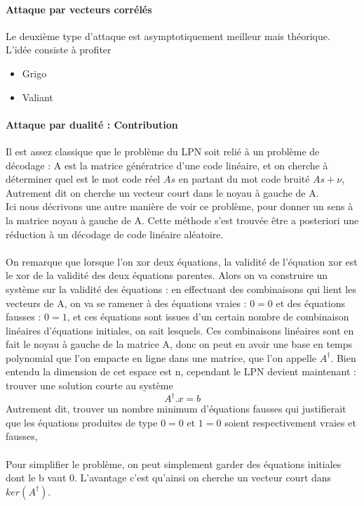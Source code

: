 \documentclass{article}		%
\theoremstyle{definition}
\theoremstyle{plain}
\begin{document}
\paragraph{Attaque par vecteurs corrélés}
Le deuxième type d'attaque est asymptotiquement meilleur mais théorique.
L'idée consiste à profiter 
\begin{itemize}
\item Grigo \cite{Indyk} \cite{Grigo}
\item Valiant \cite{Valiant}
\end{itemize}

\paragraph{Attaque par dualité : Contribution }
Il est assez classique que le problème du LPN soit relié à un problème de
décodage : A est la matrice génératrice d'une code linéaire, et on
cherche à déterminer quel est le mot code réel $As$ en partant du mot code
bruité $As+\nu$, Autrement dit on cherche un vecteur court dans le noyau à
gauche de A.
\\
 Ici nous décrivons une autre manière de voir ce
problème, pour donner un sens à la matrice noyau à gauche de A. Cette
méthode s'est trouvée être a posteriori une réduction à un décodage de
code linéaire aléatoire.
\\\\
\label{SVP} 
On remarque que lorsque l'on xor deux équations, la validité de
l'équation xor est le xor de la validité des deux équations parentes.
Alors on va construire un système sur la validité des équations : en
effectuant des combinaisons qui lient les vecteurs de A, on va se ramener
à des équations vraies : $0=0$ et des équations fausses : $0=1$, et ces
équations sont issues d'un certain nombre de combinaison linéaires
d'équations initiales, on sait lesquels. Ces combinaisons linéaires sont en
fait le noyau à gauche de la matrice A, donc on peut en avoir une base en
temps polynomial que l'on empacte en ligne dans une matrice, que l'on
appelle $A^\dagger$. Bien entendu la dimension de cet espace est n,
cependant le LPN devient maintenant : trouver une solution courte au
système  $$A^\dagger.x=b$$ Autrement dit, trouver un nombre minimum
d'équations fausses qui justifierait que les équations produites de type $0=0$ et
$1=0$ soient respectivement vraies et fausses, \\\\
Pour simplifier le problème, on peut simplement garder des équations initiales dont le b vaut 0. 
L'avantage c'est qu'ainsi on cherche un
vecteur court dans $ker(A^\dagger)$. 
\end{document}

